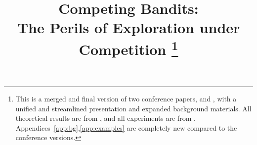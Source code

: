 \documentclass[11pt]{article}
\begin{document}

\title{Competing Bandits:\\
The Perils of Exploration under Competition%
\thanks{This is a merged and final version of two conference papers,
\citet{CompetingBandits-itcs18} and \citet{CompetingBandits-ec19},
with a unified and streamlined presentation and expanded background materials. All theoretical results are from \citet{CompetingBandits-itcs18}, and all experiments are from \citet{CompetingBandits-ec19}. Appendices~\ref{app:bg},\ref{app:examples} are completely new compared to the conference versions.}}
\end{document}
